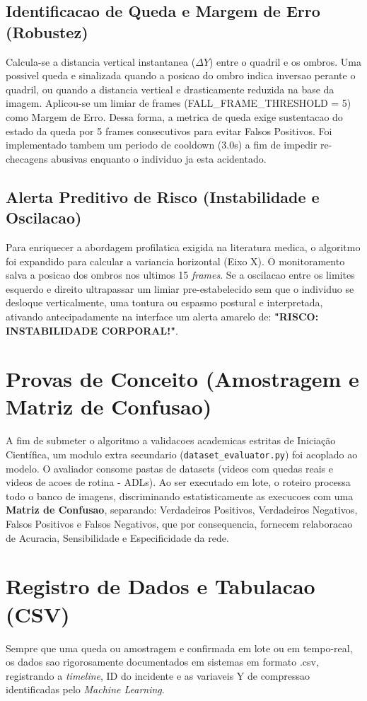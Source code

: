 \documentclass[12pt,a4paper]{article}
\begin{document}
\subsection{Identificacao de Queda e Margem de Erro (Robustez)}
Calcula-se a distancia vertical instantanea ($\Delta Y$) entre o quadril e os ombros. Uma possivel queda e sinalizada quando a posicao do ombro indica inversao perante o quadril, ou quando a distancia vertical e drasticamente reduzida na base da imagem. Aplicou-se um limiar de frames (FALL\_FRAME\_THRESHOLD = 5) como Margem de Erro. Dessa forma, a metrica de queda exige sustentacao do estado da queda por 5 frames consecutivos para evitar Falsos Positivos. Foi implementado tambem um periodo de cooldown (3.0s) a fim de impedir re-checagens abusivas enquanto o individuo ja esta acidentado.

\subsection{Alerta Preditivo de Risco (Instabilidade e Oscilacao)}
Para enriquecer a abordagem profilatica exigida na literatura medica, o algoritmo foi expandido para calcular a variancia horizontal (Eixo X). O monitoramento salva a posicao dos ombros nos ultimos 15 \textit{frames}. Se a oscilacao entre os limites esquerdo e direito ultrapassar um limiar pre-estabelecido sem que o individuo se desloque verticalmente, uma tontura ou espasmo postural e interpretada, ativando antecipadamente na interface um alerta amarelo de: \textbf{"RISCO: INSTABILIDADE CORPORAL!"}.

\section{Provas de Conceito (Amostragem e Matriz de Confusao)}
A fim de submeter o algoritmo a validacoes academicas estritas de Iniciação Científica, um modulo extra secundario (\texttt{dataset\_evaluator.py}) foi acoplado ao modelo. O avaliador consome pastas de datasets (videos com quedas reais e videos de acoes de rotina - ADLs). 
Ao ser executado em lote, o roteiro processa todo o banco de imagens, discriminando estatisticamente as execucoes com uma \textbf{Matriz de Confusao}, separando: Verdadeiros Positivos, Verdadeiros Negativos, Falsos Positivos e Falsos Negativos, que por consequencia, fornecem relaboracao de Acuracia, Sensibilidade e Especificidade da rede.

\section{Registro de Dados e Tabulacao (CSV)}
Sempre que uma queda ou amostragem e confirmada em lote ou em tempo-real, os dados sao rigorosamente documentados em sistemas em formato .csv, registrando a \textit{timeline}, ID do incidente e as variaveis Y de compressao identificadas pelo \textit{Machine Learning}.
\end{document}
